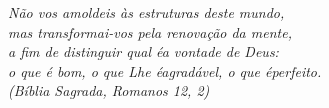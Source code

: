 \begin{epigrafe}
\vspace*{\fill}
\begin{flushright}
\textit{Não vos amoldeis às estruturas deste mundo, \\
mas transformai-vos pela renovação da mente, \\
a fim de distinguir qual éa vontade de Deus: \\
o que é bom, o que Lhe éagradável, o que éperfeito.\\
(Bíblia Sagrada, Romanos 12, 2)}
\vspace*{\fill}
\end{flushright}
\end{epigrafe}    
\cleardoublepage{}

